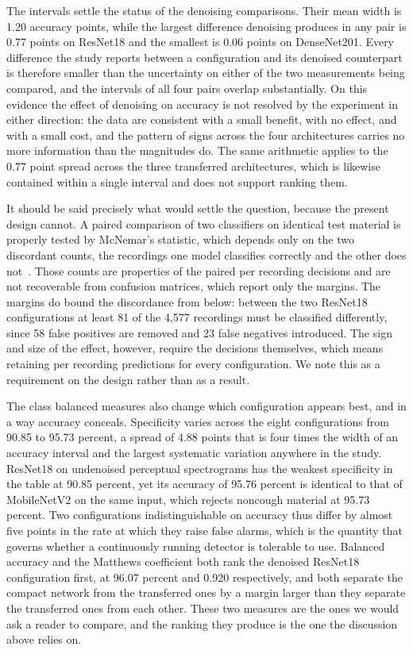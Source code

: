 \documentclass[pdflatex,sn-mathphys-num]{sn-jnl}
\begin{document}
The intervals settle the status of the denoising comparisons. Their mean width
is 1.20 accuracy points, while the largest difference denoising produces in
any pair is 0.77 points on ResNet18 and the smallest is 0.06 points on
DenseNet201. Every difference the study reports between a configuration and
its denoised counterpart is therefore smaller than the uncertainty on either
of the two measurements being compared, and the intervals of all four pairs
overlap substantially. On this evidence the effect of denoising on accuracy is
not resolved by the experiment in either direction: the data are consistent
with a small benefit, with no effect, and with a small cost, and the pattern
of signs across the four architectures carries no more information than the
magnitudes do. The same arithmetic applies to the 0.77 point spread across the
three transferred architectures, which is likewise contained within a single
interval and does not support ranking them.

It should be said precisely what would settle the question, because the
present design cannot. A paired comparison of two classifiers on identical
test material is properly tested by McNemar's statistic, which depends only on
the two discordant counts, the recordings one model classifies correctly and
the other does not~\cite{dietterich1998}. Those counts are properties of the
paired per recording decisions and are not recoverable from confusion
matrices, which report only the margins. The margins do bound the discordance
from below: between the two ResNet18 configurations at least 81 of the 4,577
recordings must be classified differently, since 58 false positives are
removed and 23 false negatives introduced. The sign and size of the effect,
however, require the decisions themselves, which means retaining per recording
predictions for every configuration. We note this as a requirement on the
design rather than as a result.

The class balanced measures also change which configuration appears best, and
in a way accuracy conceals. Specificity varies across the eight configurations
from 90.85 to 95.73 percent, a spread of 4.88 points that is four times the
width of an accuracy interval and the largest systematic variation anywhere in
the study. ResNet18 on undenoised perceptual spectrograms has the weakest
specificity in the table at 90.85 percent, yet its accuracy of 95.76 percent
is identical to that of MobileNetV2 on the same input, which rejects noncough
material at 95.73 percent. Two configurations indistinguishable on accuracy
thus differ by almost five points in the rate at which they raise false
alarms, which is the quantity that governs whether a continuously running
detector is tolerable to use. Balanced accuracy and the Matthews coefficient
both rank the denoised ResNet18 configuration first, at 96.07 percent and
0.920 respectively, and both separate the compact network from the transferred
ones by a margin larger than they separate the transferred ones from each
other. These two measures are the ones we would ask a reader to compare, and
the ranking they produce is the one the discussion above relies on.
\end{document}
